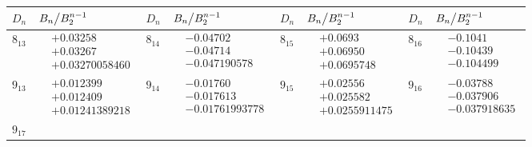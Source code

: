 \documentclass[aip,jcp,preprint,superscriptaddress,showpacs,preprintnumbers,amsmath,amssymb]{revtex4-1}
\begin{document}
\begin{table}\footnotesize
\newcommand{\vsp}{-4mm}
\begin{tabular}{ l | l | l | l | l | l | l | l }
\hline
$D_n$
&
$\left. B_n \middle/ B_2^{n-1} \right.$
&
$D_n$
&
$\left. B_n \middle/ B_2^{n-1} \right.$
&
$D_n$
&
$\left. B_n \middle/ B_2^{n-1} \right.$
&
$D_n$
&
$\left. B_n \middle/ B_2^{n-1} \right.$
\\
\hline
$8_{13}$
&
$\begin{aligned}
&+0.03258 \\[\vsp]
&+0.03267 \\[\vsp]
&+0.03270058460
\end{aligned}$
&
$8_{14}$
&
$\begin{aligned}
&-0.04702 \\[\vsp]
&-0.04714 \\[\vsp]
&-0.047190578
\end{aligned}$
&
$8_{15}$
&
$\begin{aligned}
&+0.0693 \\[\vsp]
&+0.06950 \\[\vsp]
&+0.0695748
\end{aligned}$
&
$8_{16}$
&
$\begin{aligned}
&-0.1041 \\[\vsp]
&-0.10439 \\[\vsp]
&-0.104499
\end{aligned}$
\\
\hline
$9_{13}$
&
$\begin{aligned}
&+0.012399 \\[\vsp]
&+0.012409 \\[\vsp]
&+0.01241389218
\end{aligned}$
&
$9_{14}$
&
$\begin{aligned}
&-0.01760 \\[\vsp]
&-0.017613 \\[\vsp]
&-0.01761993778
\end{aligned}$
&
$9_{15}$
&
$\begin{aligned}
&+0.02556 \\[\vsp]
&+0.025582 \\[\vsp]
&+0.0255911475
\end{aligned}$
&
$9_{16}$
&
$\begin{aligned}
&-0.03788 \\[\vsp]
&-0.037906 \\[\vsp]
&-0.037918635
\end{aligned}$
\\
\hline
$9_{17}$

\end{tabular}
\end{table}
\end{document}
